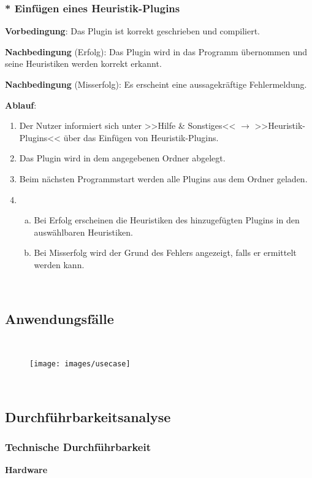 \documentclass{article}
\begin{document}
	\subsubsection{* Einfügen eines Heuristik-Plugins}
	\textbf{Vorbedingung}: Das Plugin ist korrekt geschrieben und compiliert.
	
	\textbf{Nachbedingung} (Erfolg): Das Plugin wird in das Programm übernommen und seine Heuristiken werden korrekt erkannt.
	
	\textbf{Nachbedingung} (Misserfolg): Es erscheint eine aussagekräftige Fehlermeldung.
	
	\textbf{Ablauf}:
	\begin{enumerate}[1)]
		\item{Der Nutzer informiert sich unter >>Hilfe \& Sonstiges<< $\rightarrow$ >>Heuristik-Plugins<< über das Einfügen von Heuristik-Plugins.}
		\item{Das Plugin wird in dem angegebenen Ordner abgelegt.}
		\item{Beim nächsten Programmstart werden alle Plugins aus dem Ordner geladen.}
		\item{
			\begin{enumerate}[a)]
				\item{Bei Erfolg erscheinen die Heuristiken des hinzugefügten Plugins in den auswählbaren Heuristiken.}
				\item{Bei Misserfolg wird der Grund des Fehlers angezeigt, falls er ermittelt werden kann.}
			\end{enumerate}
		}
	\end{enumerate}

	~\newpage
	\subsection{Anwendungsfälle}
	
	~\begin{figure}[!h]
		\centering
		\texttt{[image: images/usecase]}
	\end{figure}
	
	\FloatBarrier
	
	~\newpage
	\subsection{Durchführbarkeitsanalyse}
	\subsubsection{Technische Durchführbarkeit}
	\textbf{Hardware}
	
\end{document}
